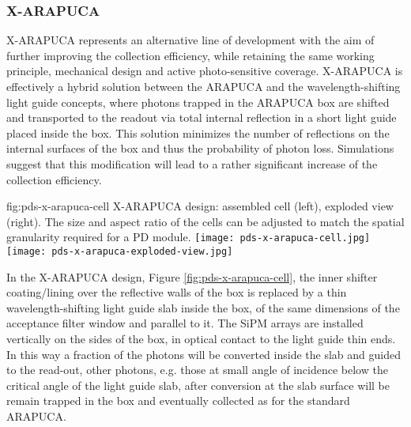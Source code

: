 
\subsubsection{X-ARAPUCA} 
\label{sssec:x-arapuca}
X-ARAPUCA represents  an alternative line of development with the aim of further improving the collection efficiency, while retaining the same working principle, mechanical design and active  photo-sensitive coverage. X-ARAPUCA is effectively a hybrid solution between the ARAPUCA and the wavelength-shifting light guide concepts, where photons trapped in the ARAPUCA box are shifted and transported to the readout via total internal reflection in a short light guide placed inside the box.
This solution minimizes the number of reflections on the internal surfaces of the box and thus the probability of photon loss. Simulations suggest that this modification will lead to a rather significant increase of the collection efficiency.

 \begin{dunefigure}{fig:pds-x-arapuca-cell}
{X-ARAPUCA design: assembled cell (left),  exploded view (right). The size and aspect ratio of the cells can be adjusted to match the spatial granularity required for a PD module.}
  \texttt{[image: pds-x-arapuca-cell.jpg]}
  \texttt{[image: pds-x-arapuca-exploded-view.jpg]}
\end{dunefigure}


In the X-ARAPUCA design, Figure \ref{fig:pds-x-arapuca-cell}, the inner shifter coating/lining over the reflective walls of the box is replaced by a thin wavelength-shifting light guide slab inside the box, of the same dimensions of the acceptance filter window and parallel to it. The SiPM arrays are installed vertically on the sides of the box, in optical contact to the light guide thin ends. 
 In this way a fraction of the photons will be converted inside the slab and guided to the read-out, other photons,  e.g. those at small angle of incidence below the critical angle of the light guide slab, after conversion at the slab surface will be remain trapped in the box and eventually collected as for the standard ARAPUCA.
 

